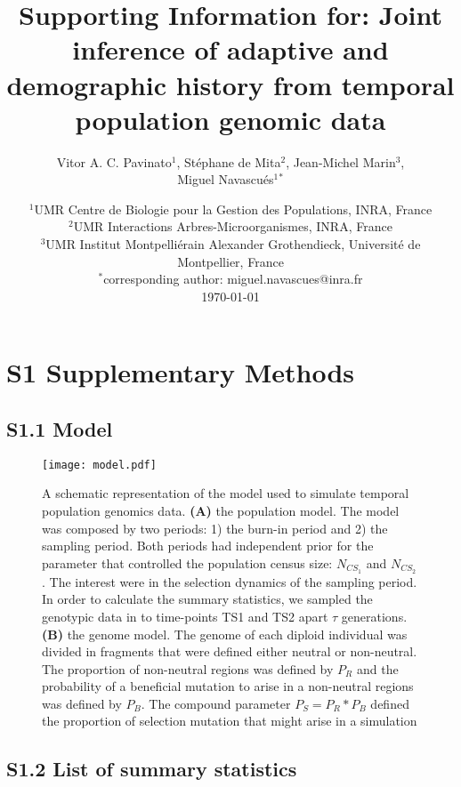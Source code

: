 \documentclass[12pt]{article}
\title{Supporting Information for: Joint inference of adaptive and demographic history from temporal population genomic data}
\author{Vitor A. C. Pavinato$^1$, Stéphane de Mita$^2$, Jean-Michel Marin$^3$, \\
			Miguel Navascués$^1$$^*$}
\date{{\myfont %
    $^1$UMR Centre de Biologie pour la Gestion des Populations, INRA, France\\%
    $^2$UMR Interactions Arbres-Microorganismes, INRA, France \\%
    $^3$UMR Institut Montpelliérain Alexander Grothendieck, Université de Montpellier, France\\%
    $^*$corresponding author: miguel.navascues@inra.fr\\[2ex]%
    }
    \today    
}
\begin{document}
\maketitle
\newpage
\section*{S1 Supplementary Methods}

\subsection*{S1.1 Model}

\begin{figure}[ht]
  \centering
  \texttt{[image: model.pdf]}
  \label{fig:figS1}
  \caption{A schematic representation of the model used to simulate temporal population genomics data. \textbf{(A)} the population model. The model was composed by two periods: 1) the burn-in period and 2) the sampling period. Both periods had independent prior for the parameter that controlled the population census size: $N_{CS_{1}}$ and $N_{CS_{2}}$. The interest were in the selection dynamics of the sampling period. In order to calculate the summary statistics, we sampled the genotypic data in to time-points TS1 and TS2 apart $\tau$ generations. \textbf{(B)} the genome model. The genome of each diploid individual was divided in fragments that were defined either neutral or non-neutral. The proportion of non-neutral regions was defined by $P_{R}$ and the probability of a beneficial mutation to arise in a non-neutral regions was defined by $P_{B}$. The compound parameter $P_{S} = P_{R}*P_{B}$ defined the proportion of selection mutation that might arise in a simulation}
\end{figure}

\subsection*{S1.2 List of summary statistics}
\end{document}
